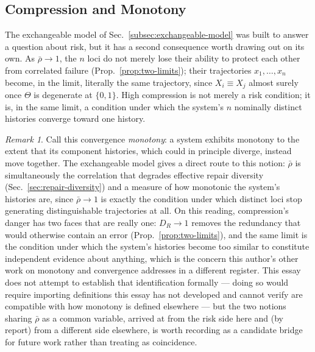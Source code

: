 \documentclass[11pt,a4paper]{article}
\theoremstyle{plain}
\theoremstyle{definition}
\theoremstyle{remark}
\newtheorem{remark}[theorem]{Remark}
\newcommand{\DR}{D_R}
\begin{document}
\subsection{Compression and Monotony}
\label{subsec:compression-monotony}

The exchangeable model of Sec.~\ref{subsec:exchangeable-model} was built to answer a question about risk, but it has a second consequence worth drawing out on its own. As $\bar\rho \to 1$, the $n$ loci do not merely lose their ability to protect each other from correlated failure (Prop.~\ref{prop:two-limits}); their trajectories $x_1,\ldots,x_n$ become, in the limit, literally the same trajectory, since $X_i \equiv X_j$ almost surely once $\Theta$ is degenerate at $\{0,1\}$. High compression is not merely a risk condition; it is, in the same limit, a condition under which the system's $n$ nominally distinct histories converge toward one history.

\begin{remark}
Call this convergence \emph{monotony}: a system exhibits monotony to the extent that its component histories, which could in principle diverge, instead move together. The exchangeable model gives a direct route to this notion: $\bar\rho$ is simultaneously the correlation that degrades effective repair diversity (Sec.~\ref{sec:repair-diversity}) and a measure of how monotonic the system's histories are, since $\bar\rho \to 1$ is exactly the condition under which distinct loci stop generating distinguishable trajectories at all. On this reading, compression's danger has two faces that are really one: $\DR \to 1$ removes the redundancy that would otherwise contain an error (Prop.~\ref{prop:two-limits}), and the same limit is the condition under which the system's histories become too similar to constitute independent evidence about anything, which is the concern this author's other work on monotony and convergence addresses in a different register. This essay does not attempt to establish that identification formally — doing so would require importing definitions this essay has not developed and cannot verify are compatible with how monotony is defined elsewhere — but the two notions sharing $\bar\rho$ as a common variable, arrived at from the risk side here and (by report) from a different side elsewhere, is worth recording as a candidate bridge for future work rather than treating as coincidence.
\end{remark}
\end{document}

